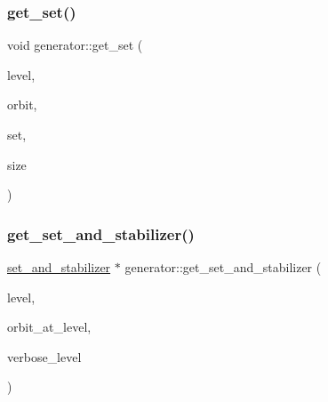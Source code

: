 \mbox{\label{classgenerator_a7b216a1bee2ff4873ba7ed40f85be0af}} 
\subsubsection{\texorpdfstring{get\+\_\+set()}{get\_set()}\hspace{0.1cm}{\footnotesize\ttfamily [2/2]}}
{\footnotesize\ttfamily void generator\+::get\+\_\+set (\begin{DoxyParamCaption}\item[{\mbox{\hyperlink{galois_8h_a09fddde158a3a20bd2dcadb609de11dc}{I\+NT}}}]{level,  }\item[{\mbox{\hyperlink{galois_8h_a09fddde158a3a20bd2dcadb609de11dc}{I\+NT}}}]{orbit,  }\item[{\mbox{\hyperlink{galois_8h_a09fddde158a3a20bd2dcadb609de11dc}{I\+NT}} $\ast$}]{set,  }\item[{\mbox{\hyperlink{galois_8h_a09fddde158a3a20bd2dcadb609de11dc}{I\+NT}} \&}]{size }\end{DoxyParamCaption})}

\mbox{\label{classgenerator_a23116270f27facfd48e4190a84e0ef20}} 
\subsubsection{\texorpdfstring{get\+\_\+set\+\_\+and\+\_\+stabilizer()}{get\_set\_and\_stabilizer()}}
{\footnotesize\ttfamily \mbox{\hyperlink{classset__and__stabilizer}{set\+\_\+and\+\_\+stabilizer}} $\ast$ generator\+::get\+\_\+set\+\_\+and\+\_\+stabilizer (\begin{DoxyParamCaption}\item[{\mbox{\hyperlink{galois_8h_a09fddde158a3a20bd2dcadb609de11dc}{I\+NT}}}]{level,  }\item[{\mbox{\hyperlink{galois_8h_a09fddde158a3a20bd2dcadb609de11dc}{I\+NT}}}]{orbit\+\_\+at\+\_\+level,  }\item[{\mbox{\hyperlink{galois_8h_a09fddde158a3a20bd2dcadb609de11dc}{I\+NT}}}]{verbose\+\_\+level }\end{DoxyParamCaption})}

